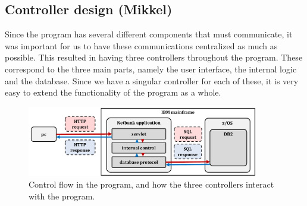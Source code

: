 \subsection{Controller design (Mikkel)}

Since the program has several different components that must communicate, it was important for us to have these communications centralized as much as possible. This resulted in having three controllers throughout the program. These correspond to the three main parts, namely the user interface, the internal logic and the database. Since we have a singular controller for each of these, it is very easy to extend the functionality of the program as a whole. 


\begin{figure}[H]
\centering
\includegraphics[width = 0.9\textwidth]{figures/control_flow.pdf}
\caption{Control flow in the program, and how the three controllers interact with the program.}
\label{fig:designcontrol}
\end{figure}